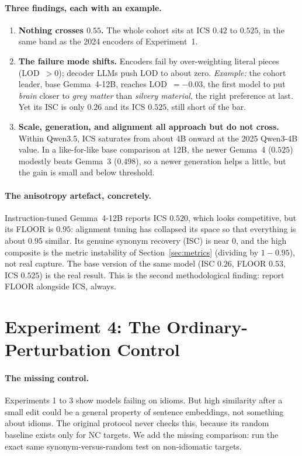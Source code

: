 \documentclass[11pt]{article}
\begin{document}
\paragraph{Three findings, each with an example.}
\begin{enumerate}
  \item \textbf{Nothing crosses $0.55$.} The whole cohort sits at ICS $0.42$ to $0.525$, in the same
  band as the 2024 encoders of Experiment~1.
  \item \textbf{The failure mode shifts.} Encoders fail by over-weighting literal pieces (LOD~$>0$);
  decoder LLMs push LOD to about zero. \emph{Example:} the cohort leader, base Gemma~4-12B, reaches
  LOD~$=-0.03$, the first model to put \emph{brain} closer to \emph{grey matter} than \emph{silvery
  material}, the right preference at last. Yet its ISC is only $0.26$ and its ICS $0.525$, still
  short of the bar.
  \item \textbf{Scale, generation, and alignment all approach but do not cross.} Within Qwen3.5, ICS
  saturates from about 4B onward at the 2025 Qwen3-4B value. In a like-for-like base comparison at
  12B, the newer Gemma~4 ($0.525$) modestly beats Gemma~3 ($0.498$), so a newer generation helps a
  little, but the gain is small and below threshold.
\end{enumerate}

\paragraph{The anisotropy artefact, concretely.} Instruction-tuned Gemma~4-12B reports ICS $0.520$,
which looks competitive, but its FLOOR is $0.95$: alignment tuning has collapsed its space so that
everything is about $0.95$ similar. Its genuine synonym recovery (ISC) is near $0$, and the high
composite is the metric instability of Section~\ref{sec:metrics} (dividing by $1-0.95$), not real
capture. The base version of the same model (ISC $0.26$, FLOOR $0.53$, ICS $0.525$) is the real
result. This is the second methodological finding: report FLOOR alongside ICS, always.

\section{Experiment 4: The Ordinary-Perturbation Control}
\label{sec:exp4}

\paragraph{The missing control.} Experiments 1 to 3 show models failing on idioms. But high
similarity after a small edit could be a general property of sentence embeddings, not something about
idioms. The original protocol never checks this, because its random baseline exists only for NC
targets. We add the missing comparison: run the exact same synonym-versus-random test on
non-idiomatic targets.
\end{document}

